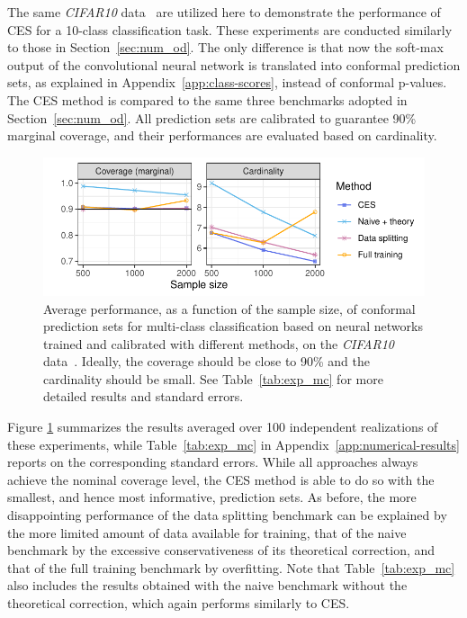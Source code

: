 The same {\em CIFAR10} data~\cite{cifar10} are utilized here to demonstrate the performance of CES for a 10-class classification task.
These experiments are conducted similarly to those in Section~\ref{sec:num_od}. The only difference is that now the soft-max output of the convolutional neural network is translated into conformal prediction sets, as explained in Appendix~\ref{app:class-scores}, instead of conformal p-values.
The CES method is compared to the same three benchmarks adopted in Section~\ref{sec:num_od}. All prediction sets are calibrated to guarantee 90\% marginal coverage, and their performances are evaluated based on cardinality.

\begin{figure}[!htb]
    \centering
    \includegraphics[width=\linewidth]{figures/exp_mc.pdf}\vspace{-0.5cm}
    \caption{Average performance, as a function of the sample size, of conformal prediction sets for multi-class classification based on neural networks trained and calibrated with different methods, on the {\em CIFAR10} data~\cite{cifar10}. Ideally, the coverage should be close to 90\% and the cardinality should be small. See Table~\ref{tab:exp_mc} for more detailed results and standard errors.}
    \label{fig:exp_mc}
\end{figure}

Figure \ref{fig:exp_mc} summarizes the results averaged over 100 independent realizations of these experiments, while Table~\ref{tab:exp_mc} in Appendix~\ref{app:numerical-results} reports on the corresponding standard errors. 
While all approaches always achieve the nominal coverage level, the CES method is able to do so with the smallest, and hence most informative, prediction sets.
As before, the more disappointing performance of the data splitting benchmark can be explained by the more limited amount of data available for training, that of the naive benchmark by the excessive conservativeness of its theoretical correction, and that of the full training benchmark by overfitting.
Note that Table~\ref{tab:exp_mc} also includes the results obtained with the naive benchmark without the theoretical correction, which again performs similarly to CES.

